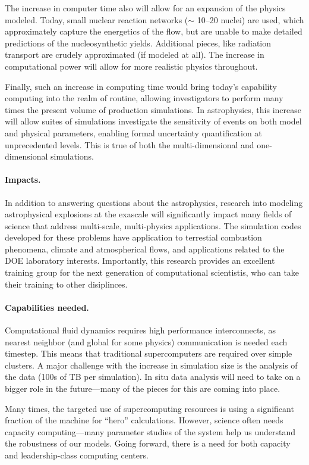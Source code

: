 \documentclass[11pt,twocolumn]{article}
\begin{document}
The increase in computer time also will allow for an expansion of the
physics modeled.  Today, small nuclear reaction networks ($\sim$
10--20 nuclei) are used, which approximately capture the energetics of
the flow, but are unable to make detailed predictions of the
nucleosynthetic yields.  Additional pieces, like radiation transport
are crudely approximated (if modeled at all).  The increase in
computational power will allow for more realistic physics throughout.

Finally, such an increase in computing time would bring today's
capability computing into the realm of routine, allowing investigators
to perform many times the present volume of production simulations.
In astrophysics, this increase will allow suites of simulations 
investigate the sensitivity of events on both model and physical
parameters, enabling formal uncertainty quantification at 
unprecedented levels.  This is true of both the multi-dimensional
and one-dimensional simulations.

\paragraph*{Impacts.} In addition to answering questions about the 
astrophysics, research into modeling astrophysical explosions at the
exascale will significantly impact many fields of science that address
multi-scale, multi-physics applications.  The simulation codes
developed for these problems have application to terrestial combustion
phenomena, climate and atmospherical flows, and applications related
to the DOE laboratory interests.  Importantly, this research provides
an excellent training group for the next generation of computational
scientistis, who can take their training to other disiplinces.


\paragraph*{Capabilities needed.}  Computational fluid dynamics requires 
high performance interconnects, as nearest neighbor (and global for
some physics) communication is needed each timestep.  This means that
traditional supercomputers are required over simple clusters.  A major
challenge with the increase in simulation size is the analysis of the
data (100s of TB per simulation).  In situ data analysis will need to
take on a bigger role in the future---many of the pieces for this are
coming into place.

Many times, the targeted use of supercomputing resources is using a
significant fraction of the machine for ``hero'' calculations.
However, science often needs capacity computing---many parameter
studies of the system help us understand the robustness of our models.
Going forward, there is a need for both capacity and leadership-class
computing centers.
\end{document}
